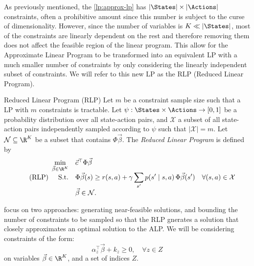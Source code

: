 As previously mentioned, the \eqref{lp:approx-lp} has $|\States| \times
|\Actions|$ constraints, often a prohibitive amount since this number is subject
to the curse of dimensionality. However, since the number of variables is $K \ll
|\States|$, most of the constraints are linearly dependent on the rest and
therefore removing them does not affect the feasible region of the linear
program. This allow for the Approximate Linear Program to be transformed into an
equivalent LP with a much smaller number of constraints by only considering the
linearly independent subset of constraints. We will refer to this new LP as the
RLP (Reduced Linear Program).

\begin{dfn}{Reduced Linear Program (RLP)}{}
    Let $m$ be a constraint sample size such that a LP with $m$ constraints is
    tractable. Let $\psi: \States \times \Actions \to [0, 1]$ be a probability
    distribution over all state-action pairs, and $\mathcal{X}$ a subset of all
    state-action pairs independently sampled according to $\psi$ such that
    $|\mathcal{X}| = m$. Let $\mathcal{N} \subseteq \R^K$ be a subset that
    contains $\Phi\vec{\beta}$.  The \emph{Reduced Linear Program} is defined by
    \begin{equation}
        \label{lp:reduced-lp}
        \tag{RLP}
        \begin{array}{rl@{}ll}
            \displaystyle \min_{\vec{\beta} \in \R^{K}} & \vec{c}^{\top} \Phi \vec{\beta} \\
            \text{S.t.} & \displaystyle \Phi \vec{\beta}(s) \geq r(s,a) + \gamma \sum_{s'} p(s' \mid s, a) \, \Phi \vec{\beta} (s') & \quad \forall (s, a) \in \mathcal{X} \\
            & \vec{\beta} \in \mathcal{N}.
        \end{array}
    \end{equation}
\end{dfn}

\citeauthor{farias2004constraint} focus on two approaches: generating
near-feasible solutions, and bounding the number of constraints to be sampled so
that the RLP gnerates a solution that closely approximates an optimal solution
to the ALP. We will be considering constraints of the form:
\begin{equation*}
    \alpha_{z}^{\top} \vec{\beta} + k_z \geq 0, \quad \forall z \in Z
\end{equation*}
on variables $\vec{\beta} \in \R^{K}$, and a set of indices $Z$.

